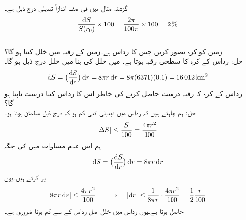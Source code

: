 گزشتہ مثال میں فی صف اندازاً تبدیلی درج ذیل ہے۔
\begin{align*}
\frac{\dif S}{S(r_0)}\times 100=\frac{2\pi}{100\pi}\times 100=\SI{2}{\percent}
\end{align*} 
\\
زمین کو کرہ تصور کریں جس کا رداس  ہے۔زمین کے رقبہ میں خلل کتنا ہو گا؟\\
حل:\quad
رداس  کے کرہ کا سطحی رقبہ  ہوتا ہے۔  میں خلل کی بنا  میں خلل درج ذیل ہو گا۔
\begin{align*}
\dif S=\big(\frac{\dif S}{\dif r}\big)\dif r=8\pi r\dif r=8\pi(6371)(0.1)=\SI{16012}{\kilo\meter\squared}
\end{align*}
رداس  کے کرہ کا رقبہ  درست حاصل کرنے کی خاطر اس کا رداس کتنا درست ناپنا ہو گا؟\\
حل:\quad
ہم چاہتے ہیں کہ رداس میں تبدیلی اتنی کم ہو کہ درج ذیل مطمئن ہوتا ہو۔
\begin{align*}
\abs{\Delta S}\le \frac{S}{100}=\frac{4\pi r^2}{100}
\end{align*}
ہم اس عدم مساوات میں  کی جگہ 
\begin{align*}
\dif S=\big(\frac{\dif S}{\dif r}\big)\dif r=8\pi r\dif r
\end{align*}
پر کرتے ہیں۔یوں
\begin{align*}
\abs{8\pi r\dif r}\le \frac{4\pi r^2}{100}\quad \implies \quad \abs{\dif r}\le \frac{1}{8\pi r}\cdot \frac{4\pi r^2}{100}=\frac{1}{2}\frac{r}{100}
\end{align*}
حاصل ہوتا ہے۔یوں رداس میں خلل اصل رداس کے  سے کم ہونا ضروری ہے۔


